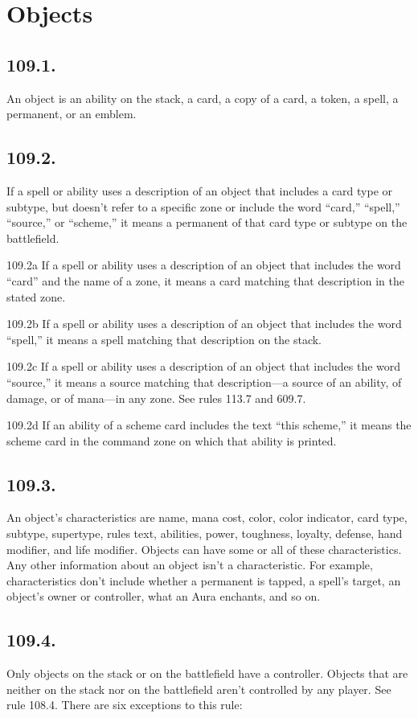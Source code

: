 \section{Objects}
\subsection*{109.1.}
An object is an ability on the stack, a card, a copy of a card, a token, a spell, a permanent, or an emblem.

\subsection*{109.2.}
If a spell or ability uses a description of an object that includes a card type or subtype, but doesn’t refer to a specific zone or include the word “card,” “spell,” “source,” or “scheme,” it means a permanent of that card type or subtype on the battlefield.

109.2a If a spell or ability uses a description of an object that includes the word “card” and the name of a zone, it means a card matching that description in the stated zone.

109.2b If a spell or ability uses a description of an object that includes the word “spell,” it means a spell matching that description on the stack.

109.2c If a spell or ability uses a description of an object that includes the word “source,” it means a source matching that description—a source of an ability, of damage, or of mana—in any zone. See rules 113.7 and 609.7.

109.2d If an ability of a scheme card includes the text “this scheme,” it means the scheme card in the command zone on which that ability is printed.

\subsection*{109.3.}
An object’s characteristics are name, mana cost, color, color indicator, card type, subtype, supertype, rules text, abilities, power, toughness, loyalty, defense, hand modifier, and life modifier. Objects can have some or all of these characteristics. Any other information about an object isn’t a characteristic. For example, characteristics don’t include whether a permanent is tapped, a spell’s target, an object’s owner or controller, what an Aura enchants, and so on.

\subsection*{109.4.}
Only objects on the stack or on the battlefield have a controller. Objects that are neither on the stack nor on the battlefield aren’t controlled by any player. See rule 108.4. There are six exceptions to this rule:


